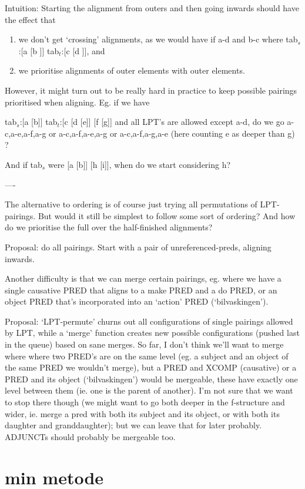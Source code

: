 \documentclass[11pt,a4paper,oneside,draft]{book}
\begin{document}
Intuition: Starting the alignment from outers and then going
inwards should have the effect that  

\begin{enumerate}
\item we don't get `crossing' alignments, as we would have if 
   a-d and b-c where tab$_s$:[a [b ]] tab$_t$:[c [d ]], and
\item we prioritise alignments of outer elements with outer 
   elements.
\end{enumerate}
However, it might turn out to be really hard in practice to keep
possible pairings prioritised when aligning. Eg. if we have

tab$_s$:[a [b]] tab$_t$:[c [d [e]] [f [g]]
and all LPT's are allowed except a-d, do we go
a-c,a-e,a-f,a-g
or
a-c,a-f,a-e,a-g 
or 
a-c,a-f,a-g,a-e (here counting e as deeper than g)
?

And if tab$_s$ were [a [b]] [h [i]], when do we start considering h?

----

The alternative to ordering is of course just trying all permutations
of LPT-pairings. But would it still be simplest to follow some sort of
ordering? And how do we prioritise the full over the half-finished
alignments?

Proposal: do all pairings. Start with a pair of unreferenced-preds,
aligning inwards.

Another difficulty is that we can merge certain pairings, eg. where we
have a single causative PRED that aligns to a make PRED and a do PRED,
or an object PRED that's incorporated into an `action'
PRED (`bilvaskingen'). 

Proposal: `LPT-permute' churns out all configurations of single
pairings allowed by LPT, while a `merge' function creates new possible
configurations (pushed last in the queue) based on sane merges. So
far, I don't think we'll want to merge where where two PRED's are on
the same level (eg. a subject and an object of the same PRED we
wouldn't merge), but a PRED and XCOMP (causative) or a PRED and its
object (`bilvaskingen') would be mergeable, these have exactly one
level between them (ie. one is the parent of another). I'm not sure
that we want to stop there though (we might want to go both deeper in
the f-structure and wider, ie. merge a pred with both its subject and
its object, or with both its daughter and granddaughter); but we can
leave that for later probably. ADJUNCTs should probably be mergeable
too.

\section{min metode}
\label{sec-4.2}
\end{document}
